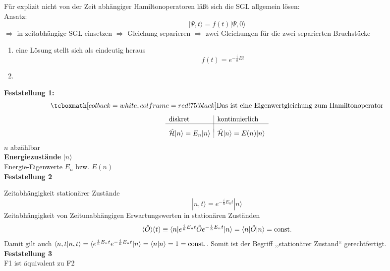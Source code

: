 Für explizit nicht von der Zeit abhängiger Hamiltonoperatoren läßt sich die SGL allgemein lösen:\\[5pt]
Ansatz:
\begin{equation*}
|\Psi,t\rangle = f(t) |\Psi,0\rangle
\end{equation*}
$ \Rightarrow $ in zeitabhängige SGL einsetzen $ \Rightarrow $ Gleichung separieren $ \Rightarrow $ zwei Gleichungen für die zwei separierten Bruchstücke
\begin{enumerate}[(1)]
	\item eine Lösung stellt sich als eindeutig heraus
	$$ f(t) = e^{-\frac{i}{\hbar} Et} $$
	\item$ \phantom{0} $\\[-30pt]
\end{enumerate}
\textbf{Feststellung 1:}
\begin{equation*}
\rmbox{\tx{Das ist eine Eigenwertgleichung zum Hamiltonoperator}}
\end{equation*}
\begin{equation*}
\begin{array}{l|l}
	\textrm{diskret} & \textrm{kontinuierlich}\\
	\hline\\[-5pt]
	\hat{\mathcal{H}} |n\rangle = E_n |n\rangle & \hat{\mathcal{H}} |n\rangle = E(n) |n\rangle\\
\end{array}
\end{equation*}
$ n $ abzählbar\\
\textbf{Energiezustände} $ |n\rangle $\\
Energie-Eigenwerte $ E_n $ bzw. $ E(n) $\\[5pt]
\textbf{Feststellung 2}
\begin{center}
	\begin{minipage}{.65\linewidth}
	\end{minipage}
\end{center}
Zeitabhängigkeit stationärer Zustände
\begin{equation*}
|n,t\rangle = e^{-\frac{i}{\hbar} E_n t} |n\rangle
\end{equation*}
Zeitabhängigkeit von Zeitunabhängigen Erwartungswerten in stationären Zuständen
\begin{equation*}
\langle \hat{O} \rangle (t) \equiv \langle n | e^{\frac{i}{\hbar} E_n t} \hat{O} e^{-\frac{i}{\hbar} E_n t} |n \rangle = \langle n | \hat{O} | n \rangle = \textrm{const.}
\end{equation*}
Damit gilt auch $ \langle n , t | n , t \rangle = \langle e^{\frac{i}{\hbar} E_n t} e^{-\frac{i}{\hbar} E_n t} | n \rangle = \langle n | n \rangle = 1 = \textrm{const.} $. Somit ist der Begriff ,,stationärer Zustand`` gerechtfertigt.\\[5pt]
\textbf{Feststellung 3}\\
F1 ist äquivalent zu F2\\[10pt]


